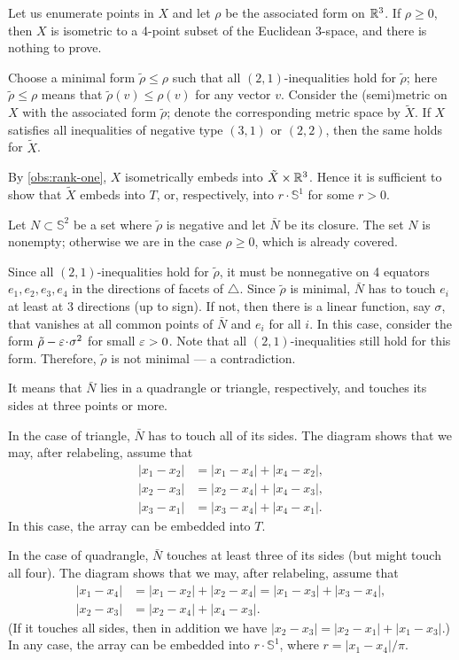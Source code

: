 \documentclass[a4paper,10pt]{article}
\begin{document}
Let us enumerate points in $X$ and let $\rho$ be the associated form on $\mathbb{R}^3$.
If $\rho\ge 0$, then $X$ is isometric to a 4-point subset of the Euclidean 3-space,
and there is nothing to prove.

Choose a minimal form $\tilde\rho\le \rho$ such that all $(2,1)$-inequalities hold for $\tilde\rho$;
here $\tilde\rho\le \rho$ means that $\tilde\rho(v)\le \rho(v)$ for any vector $v$.
Consider the (semi)metric on $X$ with the associated form $\tilde\rho$;
denote the corresponding metric space by $\tilde X$.
If $X$ satisfies all inequalities of negative type $(3, 1)$ or $(2,2)$, then the same holds for $\tilde X$.

By \ref{obs:rank-one}, $X$ isometrically embeds into $\tilde X\times \mathbb{R}^3$.
Hence it is sufficient to show that $\tilde X$ embeds into $T$, or, respectively, into $r\cdot \mathbb{S}^1$ for some $r>0$.

Let $N\subset \mathbb{S}^2$ be a set where $\tilde\rho$ is negative and let $\bar N$ be its closure.
The set $N$ is nonempty; otherwise we are in the case $\rho\ge 0$, which is already covered.

Since all $(2,1)$-inequalities hold for $\tilde\rho$,
it must be nonnegative on 4 equators $e_1,e_2,e_3,e_4$ in the directions of facets of $\triangle$.
Since $\tilde\rho$ is minimal, $\bar N$ has to touch $e_i$ at least at 3 directions (up to sign). 
If not, then there is a linear function, say $\sigma$, that vanishes at all common points of $\bar N$ and $e_i$ for all $i$.
In this case, consider the form $\tilde\rho-\eps\cdot \sigma^2$ for small $\varepsilon>0$.
Note that all $(2,1)$-inequalities still hold for this form.
Therefore, $\tilde\rho$ is not minimal --- a contradiction.

It means that $\bar N$ lies in a quadrangle or triangle, respectively, and touches its sides at three points or more.

In the case of triangle, $\bar N$ has to touch all of its sides.
The diagram shows that we may, after relabeling, assume that
\begin{align*}
|x_1-x_2|&=|x_1-x_4|+|x_4-x_2|,
\\
|x_2-x_3|&=|x_2-x_4|+|x_4-x_3|,
\\
|x_3-x_1|&=|x_3-x_4|+|x_4-x_1|.
\end{align*}
In this case, the array can be embedded into $T$.

In the case of quadrangle, $\bar N$ touches at least three of its sides (but might touch all four).
The diagram shows that we may, after relabeling, assume that
\begin{align*}
|x_1-x_4|&=|x_1-x_2|+|x_2-x_4|=|x_1-x_3|+|x_3-x_4|,
\\
|x_2-x_3|&=|x_2-x_4|+|x_4-x_3|.
\end{align*}
(If it touches all sides, then in addition we have $|x_2-x_3|=|x_2-x_1|+|x_1-x_3|$.)
In any case, the array can be embedded into $r\cdot \mathbb{S}^1$, where $r=|x_1-x_4|/\pi$.
\qeds
\end{document}
